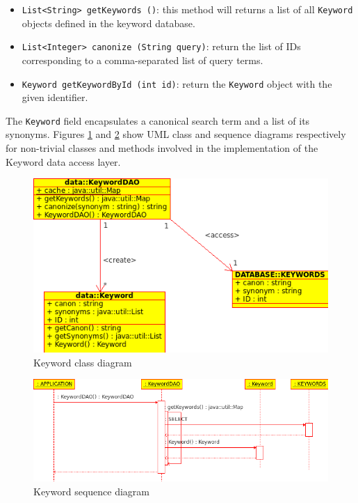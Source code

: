 \documentclass[10pt]{report}
\begin{document}
\begin{itemize}
\item \texttt{List<String> getKeywords ()}: this method
  will returns a list of all \texttt{Keyword} objects defined in the
  keyword database. 

\item \texttt{List<Integer> canonize (String query)}: return the list
  of IDs corresponding to a comma-separated list of query terms.

\item \texttt{Keyword getKeywordById (int id)}: return the
  \texttt{Keyword} object with the given identifier.
\end{itemize}

The \texttt{Keyword} field encapsulates a canonical search term and a
list of its synonyms. Figures \ref{fig:keywordclassdiagram} and
\ref{fig:keywordsequencediagram} show UML class and sequence diagrams
respectively for non-trivial classes and methods involved in the
implementation of the Keyword data access layer. 

\begin{figure}
  \begin{center}
        \includegraphics[width=\textwidth,height=!]{keywordclassdiagram}
  \end{center}
  \caption{Keyword class diagram}
  \label{fig:keywordclassdiagram}
\end{figure} 

\begin{figure}
  \begin{center}
        \includegraphics[width=\textwidth,height=!]{keywordsequencediagram}
  \end{center}
  \caption{Keyword sequence diagram}
  \label{fig:keywordsequencediagram}
\end{figure} 
\end{document}
